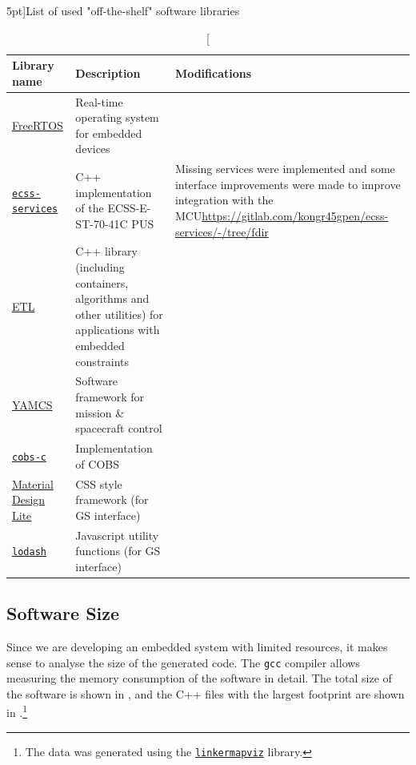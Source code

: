 \documentclass[a4paper,nobib]{tufte-book}
\begin{document}
\begin{table}[h]
	\centering
	\vspace{2em}
	\caption[][5pt]{List of used "off-the-shelf" software libraries}
	\renewcommand{\arraystretch}{1.5}
	\label{tab:old_software}
	\begin{tabularx}{\textwidth}{@{}lp{6cm}X@{}}
		\toprule
		Library name & Description & Modifications \\ \midrule
		\href{https://www.freertos.org/}{FreeRTOS} & Real-time operating system for embedded devices & \\
		\href{https://gitlab.com/acubesat/obc/ecss-services}{\texttt{ecss-services}} & C++ implementation of the ECSS-E-ST-70-41C \acl{PUS} %
		& \small Missing services were implemented and some interface improvements were made to improve integration with the \acs{MCU}\newline\small\url{https://gitlab.com/kongr45gpen/ecss-services/-/tree/fdir}
		 \\
		 \href{https://www.etlcpp.com/}{\acs{ETL}}  & C++ library (including containers, algorithms and other utilities) for applications with embedded constraints &
		 \\
 		\href{https://github.com/yamcs/yamcs}{\acs{YAMCS}}  & Software framework for mission \& spacecraft control & %
 		\\
		\href{https://github.com/cmcqueen/cobs-c}{\texttt{cobs-c}}  & Implementation of \ac{COBS} %
		 & \\
		 \href{https://getmdl.io/}{Material Design Lite} & CSS style framework (for \acs{GS} interface) & \\
		 \href{https://lodash.com/}{\texttt{lodash}} & Javascript utility functions (for \acs{GS} interface) & \\
		\bottomrule
	\end{tabularx}
\end{table}


\FloatBarrier
\subsection{Software Size}

Since we are developing an embedded system with limited resources, it makes sense to analyse the size of the generated code. The \texttt{gcc} compiler allows measuring the memory consumption of the software in detail. The total size of the software is shown in , and the C++ files with the largest footprint are shown in .\footnote{The data was generated using the \href{https://github.com/PromyLOPh/linkermapviz}{\texttt{linkermapviz}} library.}
\end{document}
